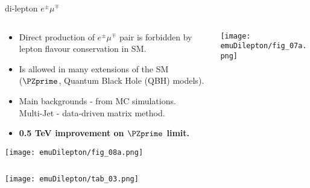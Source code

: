 \documentclass[8pt]{beamer}
\begin{document}
\begin{frame}{\large di-lepton $e^{\pm}\mu^{\mp}$}

\begin{columns}
  \begin{column}{6cm}
    \begin{itemize}
      \item Direct production of $e^{\pm}\mu^{\mp}$ pair is forbidden by 
	    lepton flavour conservation in SM.\\ 
      \item Is allowed in many extensions of the SM \\
	    ($\PZprime$, Quantum Black Hole (QBH) models).
      \item Main backgrounds - from MC simulations. \\
	    Multi-Jet - data-driven matrix method.
      \item \textbf{0.5 TeV improvement on $\PZprime$ limit.}
    \end{itemize}
    
    \texttt{[image: emuDilepton/fig\_08a.png]}\\
    
  \end{column}
  \begin{column}{6.2cm}
    \texttt{[image: emuDilepton/fig\_07a.png]}\\
    

      
  \end{column}
\end{columns}

{\centering
  \texttt{[image: emuDilepton/tab\_03.png]}\\
}

\end{frame} 
\end{document}
